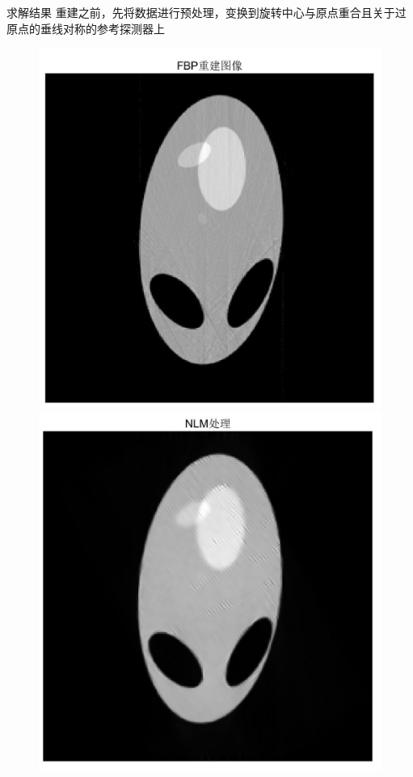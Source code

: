 \documentclass{beamer} %
\begin{document}
\begin{frame}{求解结果}
	重建之前，先将数据进行预处理，变换到旋转中心与原点重合且关于过原点的垂线对称的参考探测器上\\
	\begin{figure}[H]
		\begin{minipage}[H]{0.4\textwidth}
		\centering
		\includegraphics[width=\textwidth]{./pic/P2_FBP.jpg}
		\end{minipage}
		\begin{minipage}[H]{0.4\textwidth}
		\centering
		\includegraphics[width=\textwidth]{./pic/P2-ART-5-NLM.jpg}

\end{minipage}
\end{figure}
\end{frame}
\end{document}
